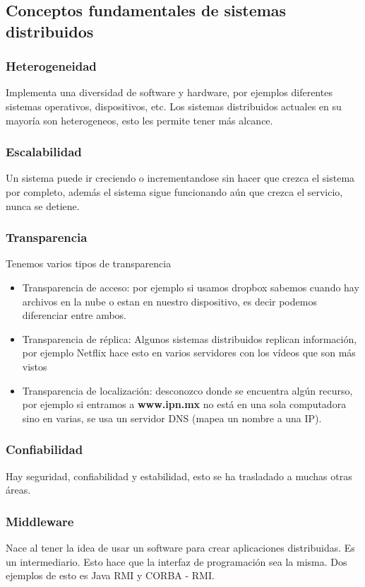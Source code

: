 \subsection{Conceptos fundamentales de sistemas distribuidos}
\subsubsection{Heterogeneidad}
Implementa una diversidad de software y hardware, por ejemplos diferentes sistemas operativos, dispositivos, etc. Los sistemas distribuidos actuales en su mayoría son heterogeneos, esto les permite tener más alcance.

\subsubsection{Escalabilidad}
Un sistema puede ir creciendo o incrementandose sin hacer que crezca el sistema por completo, además el sistema sigue funcionando aún que crezca el servicio, nunca se detiene.

\subsubsection{Transparencia}
Tenemos varios tipos de transparencia
\begin{itemize}
    \item {Transparencia de acceso: por ejemplo si usamos dropbox sabemos cuando hay archivos en la nube o estan en nuestro dispositivo, es decir podemos diferenciar entre ambos.}
    \item {Transparencia de réplica: Algunos sistemas distribuidos replican información, por ejemplo Netflix hace esto en varios servidores con los vídeos que son más vistos}
    \item {Transparencia de localización: desconozco donde se encuentra algún recurso, por ejemplo si entramos a \textbf{www.ipn.mx} no está en una sola computadora sino en varias, se usa un servidor DNS (mapea un nombre a una IP).}
\end{itemize}

\subsubsection{Confiabilidad}
Hay seguridad, confiabilidad y estabilidad, esto se ha trasladado a muchas otras áreas.

\subsubsection{Middleware}
Nace al tener la idea de usar un software para crear aplicaciones distribuidas. Es un intermediario. Esto hace que la interfaz de programación sea la misma. Dos ejemplos de esto es Java RMI y CORBA - RMI.

